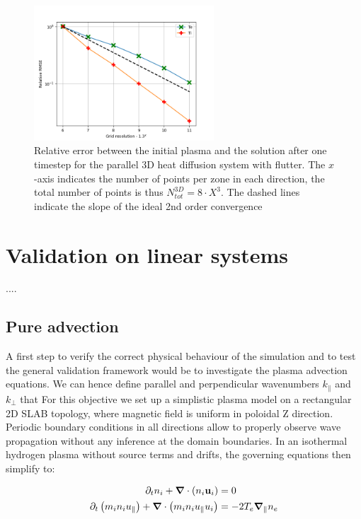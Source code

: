 \begin{figure}[H]
	\centering
	\includegraphics[width=0.6\textwidth]{schemes/err_rel_paradif_Brad_grid2_3D.png}
	\caption{Relative error between the initial plasma and the solution after one timestep for the parallel 3D heat diffusion system with flutter. The $x$-axis indicates the number of points per zone in each direction, the total number of points is thus $N_{tot}^{3D} = 8\cdot X^3$. The dashed lines indicate the slope of the ideal 2nd order convergence}
	\label{fig:MMSTorturedFlutterDiffParaConvergence}
\end{figure}




\section{Validation on linear systems}

.... 
\subsection{Pure advection}
A first step to verify the correct physical behaviour of the simulation and to test the general validation framework would be to investigate the plasma advection equations. We can hence define parallel and perpendicular wavenumbers $k_\parallel$ and $k_\perp$ that  For this objective we set up a simplistic plasma model on a rectangular 2D SLAB topology, where magnetic field is uniform in poloidal Z direction. Periodic boundary conditions in all directions allow to properly observe wave propagation without any inference at the domain boundaries. In an isothermal hydrogen plasma without source terms and drifts, the governing equations then simplify to:

\begin{align}
	\partial_t n_i + \grad\cdot\left(n_i\mathbf{u}_i\right) &= 0 \label{eq:AdvectionLinearAnalysis_ionMass} \\
	\partial_t \left(m_in_iu_\parallel\right) + \grad\cdot\left(m_in_iu_\parallel u_i\right) &= -2T_e\grad_\parallel n_e \label{eq:AdvectionLinearAnalysis_parallelMomentumBalance}
\end{align}

